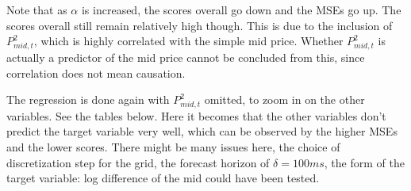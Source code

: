 \documentclass[english, 11pt, a4paper]{article}
\begin{document}
Note that as $\alpha$ is increased, the scores overall go down and the MSEs go up. The scores
overall still remain relatively high though. This is due to the inclusion of  $P_{mid, t}^2$, which is highly correlated with the simple mid
price. Whether $P_{mid, t}^2$ is actually a predictor of the mid price cannot be concluded from
this, since correlation does not mean causation. 

The regression is done again with $P_{mid, t}^2$ omitted, to zoom in on the other variables. See the
tables below. Here it becomes that the other variables don't predict the target variable very well,
which can be observed by the higher MSEs and the lower scores. There might be many issues here, the
choice of discretization step for the grid, the forecast horizon of $\delta = 100ms$, the form of
the target variable: log difference of the mid could have been tested. 
\end{document}
